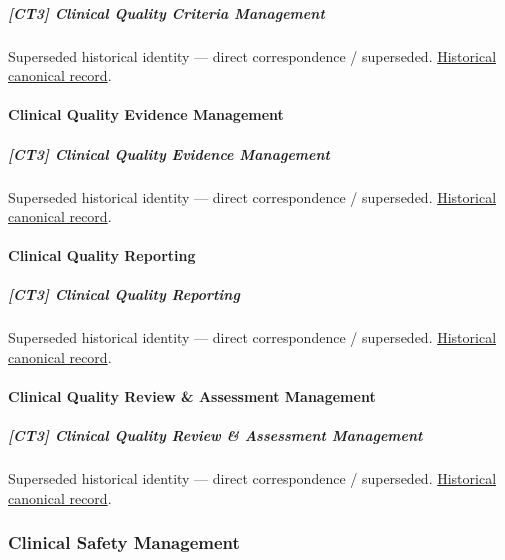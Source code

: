 \subparagraph{[CT3] Clinical Quality Criteria Management}

\par\label{element:7a51321b00464016920976b269981edd}
Superseded historical identity — direct correspondence / superseded. \href{../../../../continuum/strategy/capability/7a51321b00464016920976b269981edd.md}{Historical canonical record}.\par

\paragraph{Clinical Quality Evidence Management}

\subparagraph{[CT3] Clinical Quality Evidence Management}

\par\label{element:f31902d474894670aeef3e0abbedccf0}
Superseded historical identity — direct correspondence / superseded. \href{../../../../continuum/strategy/capability/f31902d474894670aeef3e0abbedccf0.md}{Historical canonical record}.\par

\paragraph{Clinical Quality Reporting}

\subparagraph{[CT3] Clinical Quality Reporting}

\par\label{element:e5812fcdf3f5465b9b1d8ba536075c5f}
Superseded historical identity — direct correspondence / superseded. \href{../../../../continuum/strategy/capability/e5812fcdf3f5465b9b1d8ba536075c5f.md}{Historical canonical record}.\par

\paragraph{Clinical Quality Review \& Assessment Management}

\subparagraph{[CT3] Clinical Quality Review \& Assessment Management}

\par\label{element:4b17ec92f0af4c4b9556912dbdd0f29f}
Superseded historical identity — direct correspondence / superseded. \href{../../../../continuum/strategy/capability/4b17ec92f0af4c4b9556912dbdd0f29f.md}{Historical canonical record}.\par

\subsubsection{Clinical Safety Management}

